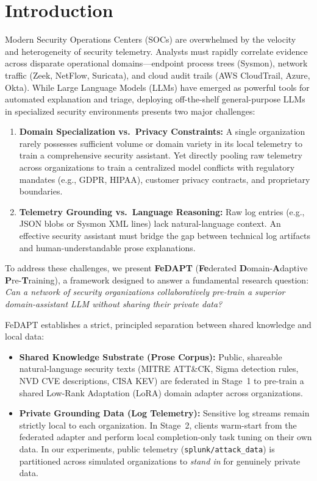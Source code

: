 \documentclass[11pt,a4paper]{article}
\begin{document}
\section{Introduction}
Modern Security Operations Centers (SOCs) are overwhelmed by the velocity and heterogeneity of security telemetry. Analysts must rapidly correlate evidence across disparate operational domains---endpoint process trees (Sysmon), network traffic (Zeek, NetFlow, Suricata), and cloud audit trails (AWS CloudTrail, Azure, Okta). While Large Language Models (LLMs) have emerged as powerful tools for automated explanation and triage, deploying off-the-shelf general-purpose LLMs in specialized security environments presents two major challenges:
\begin{enumerate}
    \item \textbf{Domain Specialization vs.\ Privacy Constraints:} A single organization rarely possesses sufficient volume or domain variety in its local telemetry to train a comprehensive security assistant. Yet directly pooling raw telemetry across organizations to train a centralized model conflicts with regulatory mandates (e.g., GDPR, HIPAA), customer privacy contracts, and proprietary boundaries.
    \item \textbf{Telemetry Grounding vs.\ Language Reasoning:} Raw log entries (e.g., JSON blobs or Sysmon XML lines) lack natural-language context. An effective security assistant must bridge the gap between technical log artifacts and human-understandable prose explanations.
\end{enumerate}

To address these challenges, we present \textbf{FeDAPT} (\textbf{Fe}derated \textbf{D}omain-\textbf{A}daptive \textbf{P}re-\textbf{T}raining), a framework designed to answer a fundamental research question: \emph{Can a network of security organizations collaboratively pre-train a superior domain-assistant LLM without sharing their private data?}

FeDAPT establishes a strict, principled separation between shared knowledge and local data:
\begin{itemize}
    \item \textbf{Shared Knowledge Substrate (Prose Corpus):} Public, shareable natural-language security texts (MITRE ATT\&CK, Sigma detection rules, NVD CVE descriptions, CISA KEV) are federated in Stage~1 to pre-train a shared Low-Rank Adaptation (LoRA) domain adapter across organizations.
    \item \textbf{Private Grounding Data (Log Telemetry):} Sensitive log streams remain strictly local to each organization. In Stage~2, clients warm-start from the federated adapter and perform local completion-only task tuning on their own data. In our experiments, public telemetry (\texttt{splunk/attack\_data}) is partitioned across simulated organizations to \emph{stand in} for genuinely private data.
\end{itemize}
\end{document}

